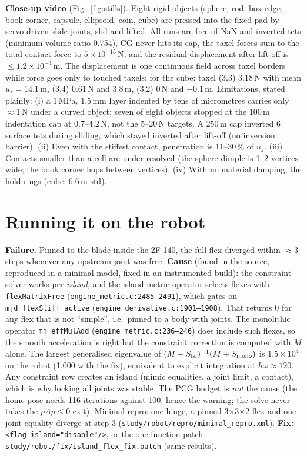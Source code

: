\documentclass[10pt,twocolumn]{article}
\newcommand{\code}[1]{\texttt{\small #1}}
\newcommand{\src}[1]{\texttt{\footnotesize #1}}
\newcommand{\um}{\,\textmu m}
\begin{document}
\textbf{Close-up video} (Fig.~\ref{fig:stills}). Eight rigid objects (sphere, rod, box edge, book corner, capsule,
ellipsoid, coin, cube) are pressed into the fixed pad by servo-driven slide joints, slid and lifted. All runs are free
of NaN and inverted tets (minimum volume ratio 0.754), CG never hits its cap, the taxel forces sum to the total contact
force to $5\times10^{-15}$\,N, and the residual displacement after lift-off is $\le1.2\times10^{-4}$\um. The displacement
is one continuous field across taxel borders while force goes only to touched taxels; for the cube: taxel (3,3)
3.18\,N with mean $u_z=14.1$\um, (3,4) 0.61\,N and 3.8\um, (3,2) 0\,N and $-0.1$\um. Limitations, stated plainly:
(i) a 1\,MPa, 1.5\,mm layer indented by tens of micrometres carries only $\approx$1\,N under a curved object; seven of
eight objects stopped at the 100\um{} indentation cap at 0.7--4.2\,N, not the 5--20\,N targets. A 250\um{} cap
inverted 6 surface tets during sliding, which stayed inverted after lift-off (no inversion barrier).
(ii) Even with the stiffest contact, penetration is 11--30\,\% of $u_z$. (iii) Contacts smaller than a cell are
under-resolved (the sphere dimple is 1--2 vertices wide; the book corner hops between vertices). (iv) With no material
damping, the hold rings (cube: 6.6\um{} std).

\section{Running it on the robot}
\label{sec:robot}
\textbf{Failure.} Pinned to the blade inside the 2F-140, the full flex diverged within $\approx$3 steps whenever any
upstream joint was free. \textbf{Cause} (found in the source, reproduced in a minimal model, fixed in an instrumented
build): the constraint solver works per \emph{island}, and the island metric operator selects flexes with
\code{flexMatrixFree} (\src{engine\_metric.c:2485--2491}), which gates on \code{mjd\_flexStiff\_active}
(\src{engine\_derivative.c:1901--1908}). That returns 0 for any flex that is not ``simple'', i.e.\ pinned to a body
with joints. The monolithic operator \code{mj\_effMulAdd} (\src{engine\_metric.c:236--246}) does include such flexes,
so the smooth acceleration is right but the constraint correction is computed with $M$ alone. The largest generalised
eigenvalue of $(M+S_{\rm isl})^{-1}(M+S_{\rm mono})$ is $1.5\times10^4$ on the robot (1.000 with the fix), equivalent
to explicit integration at $h\omega\approx120$. Any constraint row creates an island (mimic equalities, a joint limit,
a contact), which is why locking all joints was stable. The PCG budget is \emph{not} the cause (the home pose needs
116 iterations against 100, hence the warning; the solve never takes the $pAp\le0$ exit). Minimal repro: one hinge, a
pinned 3$\times$3$\times$2 flex and one joint equality diverge at step 3 (\code{study/robot/repro/minimal\_repro.xml}).
\textbf{Fix:} \code{<flag island="disable"/>}, or the one-function patch \code{study/robot/fix/island\_flex\_fix.patch}
(same results).
\end{document}
